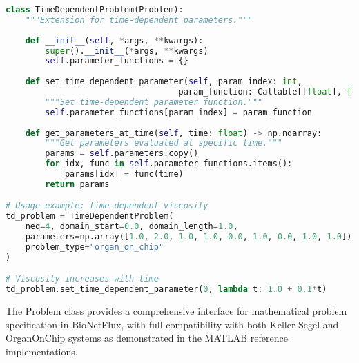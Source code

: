 \begin{lstlisting}[language=Python, caption=Time-Dependent Problem Setup]
class TimeDependentProblem(Problem):
    """Extension for time-dependent parameters."""
    
    def __init__(self, *args, **kwargs):
        super().__init__(*args, **kwargs)
        self.parameter_functions = {}
    
    def set_time_dependent_parameter(self, param_index: int,
                                   param_function: Callable[[float], float]):
        """Set time-dependent parameter function."""
        self.parameter_functions[param_index] = param_function
    
    def get_parameters_at_time(self, time: float) -> np.ndarray:
        """Get parameters evaluated at specific time."""
        params = self.parameters.copy()
        for idx, func in self.parameter_functions.items():
            params[idx] = func(time)
        return params

# Usage example: time-dependent viscosity
td_problem = TimeDependentProblem(
    neq=4, domain_start=0.0, domain_length=1.0,
    parameters=np.array([1.0, 2.0, 1.0, 1.0, 0.0, 1.0, 0.0, 1.0, 1.0]),
    problem_type="organ_on_chip"
)

# Viscosity increases with time
td_problem.set_time_dependent_parameter(0, lambda t: 1.0 + 0.1*t)
\end{lstlisting}

The Problem class provides a comprehensive interface for mathematical problem specification in BioNetFlux, with full compatibility with both Keller-Segel and OrganOnChip systems as demonstrated in the MATLAB reference implementations.

